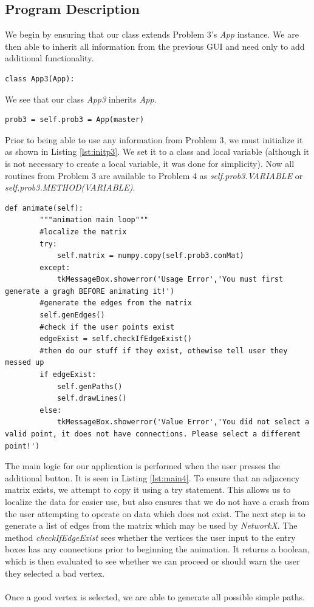 \subsection{Program Description} %
\label{sub:program_description4}
We begin by ensuring that our class extends Problem 3's \emph{App} instance. We are then able to inherit all information from the previous GUI and need only to add additional functionality.
\begin{lstlisting}[caption={Inheritance of Problem 4}, label=lst:inherit,firstnumber=5]
class App3(App):
\end{lstlisting}\noindent
We see that our class \emph{App3} inherits \emph{App}. 
\begin{lstlisting}[caption={Initialization of Problem 3}, label=lst:initp3,firstnumber=12]
    prob3 = self.prob3 = App(master)
\end{lstlisting}\noindent
Prior to being able to use any information from Problem 3, we must initialize it as shown in Listing \ref{lst:initp3}. We set it to a class and local variable (although it is not necessary to create a local variable, it was done for simplicity). Now all routines from Problem 3 are available to Problem 4 as \emph{self.prob3.VARIABLE} or \emph{self.prob3.METHOD(VARIABLE)}.
\begin{lstlisting}[caption={Main Logic}, label=lst:main4,firstnumber=30]
    def animate(self):
        """animation main loop"""
        #localize the matrix
        try:
            self.matrix = numpy.copy(self.prob3.conMat)
        except:
            tkMessageBox.showerror('Usage Error','You must first generate a gragh BEFORE animating it!')
        #generate the edges from the matrix
        self.genEdges()
        #check if the user points exist
        edgeExist = self.checkIfEdgeExist()
        #then do our stuff if they exist, othewise tell user they messed up
        if edgeExist:
            self.genPaths()
            self.drawLines()
        else:
            tkMessageBox.showerror('Value Error','You did not select a valid point, it does not have connections. Please select a different point!')
\end{lstlisting}\noindent
The main logic for our application is performed when the user presses the additional button. It is seen in Listing \ref{lst:main4}. To ensure that an adjacency matrix exists, we attempt to copy it using a try statement. This allows us to localize the data for easier use, but also ensures that we do not have a crash from the user attempting to operate on data which does not exist. The next step is to generate a list of edges from the matrix which may be used by \emph{NetworkX}. The method \emph{checkIfEdgeExist} sees whether the vertices the user input to the entry boxes has any connections prior to beginning the animation. It returns a boolean, which is then evaluated to see whether we can proceed or should warn the user they selected a bad vertex.\\\\
Once a good vertex is selected, we are able to generate all possible simple paths.

